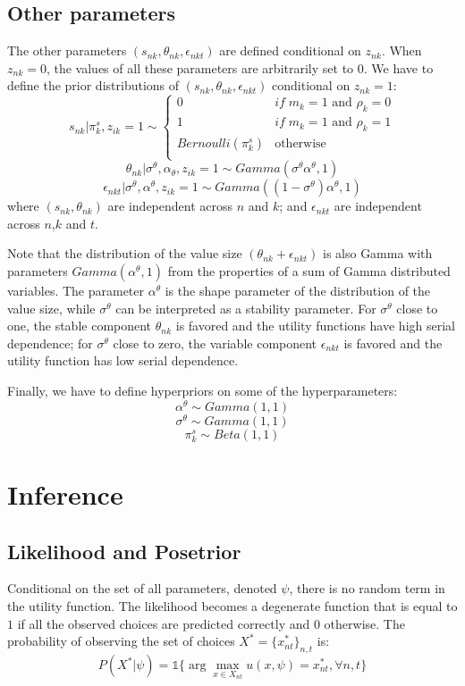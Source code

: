 \documentclass[12pt]{article}
\begin{document}
\subsection{Other parameters}

The other parameters $(s_{nk},\theta_{nk},\epsilon_{nkt})$ are defined conditional on $z_{nk}$. When $z_{nk}=0$, the values of all these parameters are arbitrarily set to $0$. We have to define the prior distributions of $(s_{nk},\theta_{nk},\epsilon_{nkt})$ conditional on $z_{nk}=1$:
$$ s_{nk}|\pi_k^s,z_{ik}=1 \sim \left\{ \begin{array}{cl}
0 & if \; m_k=1 \text{ and } \rho_k=0\\
1 & if \; m_k=1 \text{ and } \rho_k=1\\
Bernoulli(\pi_k^s) & \text{otherwise}\\
\end{array}\right.$$
$$ \theta_{nk}|\sigma^\theta,\alpha_\theta,z_{ik}=1 \sim Gamma(\sigma^\theta \alpha^\theta,1) $$
$$ \epsilon_{nkt}|\sigma^\theta,\alpha^\theta,z_{ik}=1 \sim Gamma((1-\sigma^\theta)\alpha^\theta,1) $$
where $(s_{nk},\theta_{nk})$ are independent across $n$ and $k$; and $\epsilon_{nkt}$ are independent across $n$,$k$ and $t$.

Note that the distribution of the value size $(\theta_{nk} + \epsilon_{nkt})$ is also Gamma with parameters $Gamma(\alpha^\theta,1)$ from the properties of a sum of Gamma distributed variables. The parameter $\alpha^\theta$ is the shape parameter of the distribution of the value size, while $\sigma^\theta$ can be interpreted as a stability parameter. 
For $\sigma^\theta$ close to one, the stable component $\theta_{nk}$ is favored and the utility functions have high serial dependence; for $\sigma^\theta$ close to zero, the variable component $\epsilon_{nkt}$ is favored and the utility function has low serial dependence.

Finally, we have to define hyperpriors on some of the hyperparameters:
$$\alpha^\theta \sim Gamma(1,1)$$
$$\sigma^\theta \sim Gamma(1,1)$$
$$ \pi_k^s \sim Beta(1,1) $$


\section{Inference}

\subsection{Likelihood and Posetrior} \label{sec:likelihood}
Conditional on the set of all parameters, denoted $\psi$, there is no random term in the utility function. The likelihood becomes a degenerate function that is equal to $1$ if all the observed choices are predicted correctly and $0$ otherwise. The probability of observing the set of choices $X^* = \{x_{nt}^*\}_{n,t}$ is: 
$$P(X^*|\psi) = \mathds{1}\{ \arg \max\limits_{x\in X_{nt}} u(x,\psi) = x_{nt}^*, \forall n,t \}$$
\end{document}
